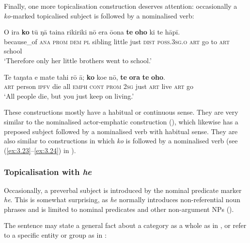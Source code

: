 Finally, one more topicalisation construction deserves attention: occasionally a \textit{ko-}marked topicalised subject is followed by a nominalised verb:

\ea\label{ex:8.89}
\gll {\ꞌ}O ira \textbf{ko} tū ŋā taina rikiriki nō era ō{\ꞌ}ona \textbf{te} \textbf{oho} ki te hāpī. \\
because\_of \textsc{ana} \textsc{prom} \textsc{dem} \textsc{pl} sibling little just \textsc{dist} \textsc{poss.3sg.o} \textsc{art} go to \textsc{art} school \\

\glt 
‘Therefore only her little brothers went to school.’ \textstyleExampleref{[R441.011]} 
\z

\ea\label{ex:8.90}
\gll Te taŋata e mate tahi rō {\ꞌ}ā; \textbf{ko} koe nō, \textbf{te} \textbf{ora} \textbf{te} \textbf{oho}. \\
\textsc{art} person \textsc{ipfv} die all \textsc{emph} \textsc{cont} \textsc{prom} \textsc{2sg} just \textsc{art} live \textsc{art} go \\

\glt
‘All people die, but you just keep on living.’ \textstyleExampleref{[R445.016–017]}
\z

These constructions mostly have a habitual or continuous sense. They are very similar to the nominalised actor-emphatic construction (), which likewise has a preposed subject followed by a nominalised verb with habitual sense. They are also similar to constructions in which \textit{ko} is followed by a nominalised verb (see (\ref{ex:3.23}–\ref{ex:3.24}) in ).

\subsubsection[Topicalisation with he]{Topicalisation with \textit{he}}\label{sec:8.6.2.2}
Occasionally, a preverbal subject is introduced by the nominal predicate marker \textit{he}. This is somewhat surprising, as \textit{he} normally introduces non-referential noun phrases and is limited to nominal predicates and other non-argument NPs ().

The sentence may state a general fact about a category as a whole as in , or refer to a specific entity or group as in :

